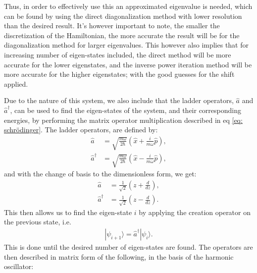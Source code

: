 \documentclass[a4paper]{article}
\newcommand{\w}{\omega}
\newcommand{\newparagraph}{\vspace{.5cm}\noindent}
\newcommand{\ket}[1]{|#1\rangle}
\begin{document}
Thus, in order to effectively use this an approximated eigenvalue is needed, which can be found by using the direct diagonalization method with lower resolution than the desired result.
It's however important to note, the smaller the discretization of the Hamiltonian, the more accurate the result will be for the diagonalization method for larger eigenvalues.
This however also implies that for increasing number of eigen-states included, the direct method will be more accurate for the lower eigenstates, and the inverse power iteration method will be more accurate for the higher eigenstates;
with the good guesses for the shift applied.

\newparagraph
Due to the nature of this system, we also include that the ladder operators, $\hat{a}$ and $\hat{a}^\dagger$, can be used to find the eigen-states of the system, and their corresponding energies, by performing the matrix operator multiplication described in eq \eqref{eq: schrödinger}.
The ladder operators, are defined by:
\begin{align*}
    \hat{a} &= \sqrt{\frac{m\w}{2\hbar}}\left(\hat{x} + \frac{i}{m\w}\hat{p}\right),\\
    \hat{a}^\dagger &= \sqrt{\frac{m\w}{2\hbar}}\left(\hat{x} - \frac{i}{m\w}\hat{p}\right),
\end{align*}and with the change of basis to the dimensionless form, we get:
\begin{align}
    \hat{a} &= \frac{1}{\sqrt{2}}\left(z + \frac{d}{dz}\right),\label{eq: down}\\
    \hat{a}^\dagger &= \frac{1}{\sqrt{2}}\left(z - \frac{d}{dz}\right)\label{eq: up}.
\end{align}This then allows us to find the eigen-state $i$ by applying the creation operator on the previous state, i.e.
\begin{align*}
    \ket{\psi_{i + 1}} = \hat{a}^\dagger\ket{\psi_i}.
\end{align*}This is done until the desired number of eigen-states are found. The operators are then described in matrix form of the following, in the basis of the harmonic oscillator:
\end{document}
